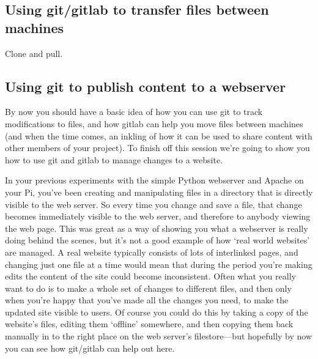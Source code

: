 \subsection{Using git/gitlab to transfer files between machines}

Clone and pull. 

\subsection{Using git to publish content to a webserver}

By now you should have a basic idea of how you can use git to track modifications to files, and how gitlab can help you move files between machines (and when the time comes, an inkling of how it can be used to share content with other members of your project). To finish off this session we're going to show you how to use git and gitlab to manage changes to a website.

In your previous experiments with the simple Python webserver and Apache on your Pi, you've been creating and manipulating files in a directory that is directly visible to the web server. So every time you change and save a file, that change becomes immediately visible to the web server, and therefore to anybody viewing the web page. This was great as a way of showing you what a webserver is really doing behind the scenes, but it's not a good example of how `real world websites' are managed. A real website typically consists of lots of interlinked pages, and changing just one file at a time would mean that during the period you're making edits the content of the site could become inconsistent. Often what you really want to do is to make a whole set of changes to different files, and then only when you're happy that you've made all the changes you need, to make the updated site visible to users. Of course you could do this by taking a copy of the website's files, editing them `offline' somewhere, and then copying them back manually in to the right place on the web server's filestore---but hopefully by now you can see how git/gitlab can help out here.
